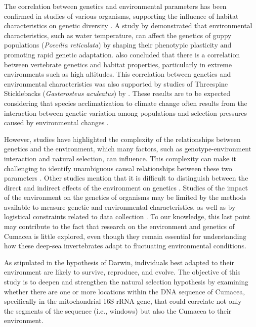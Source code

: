 The correlation between genetics and environmental parameters has been confirmed in studies of various organisms, supporting the influence of habitat characteristics on genetic diversity \citep{colosimo_widespread_2005,cheviron_genomic_2012}. A study by \cite{ghalambor_adaptive_2007} demonstrated that environmental characteristics, such as water temperature, can affect the genetics of guppy populations (\emph{Poecilia reticulata}) by shaping their phenotypic plasticity and promoting rapid genetic adaptation. \cite{cheviron_genomic_2012} also concluded that there is a correlation between vertebrate genetics and habitat properties, particularly in extreme environments such as high altitudes. This correlation between genetics and environmental characteristics was also supported by studies of Threespine Sticklebacks (\emph{Gasterosteus aculeatus}) by \citep{colosimo_widespread_2005}. These results are to be expected considering that species acclimatization to climate change often results from the interaction between genetic variation among populations and selection pressures caused by environmental changes \citep{hoffmann_climate_2011}.

However, studies have highlighted the complexity of the relationships between genetics and the environment, which many factors, such as genotype-environment interaction and natural selection, can influence. This complexity can make it challenging to identify unambiguous causal relationships between these two parameters \citep{balkenhol_identifying_2009}. Other studies mention that it is difficult to distinguish between the direct and indirect effects of the environment on genetics \citep{manel_perspectives_2010, balkenhol_landscape_2019}. Studies of the impact of the environment on the genetics of organisms may be limited by the methods available to measure genetic and environmental characteristics, as well as by logistical constraints related to data collection \citep{manel_perspectives_2010, shafer_widespread_2013}. To our knowledge, this last point may contribute to the fact that research on the environment and genetics of Cumacea is little explored, even though they remain essential for understanding how these deep-sea invertebrates adapt to fluctuating environmental conditions.

As stipulated in the hypothesis of Darwin, individuals best adapted to their environment are likely to survive, reproduce, and evolve. The objective of this study is to deepen and strengthen the natural selection hypothesis by examining whether there are one or more locations within the DNA sequence of Cumacea, specifically in the mitochondrial 16S rRNA gene, that could correlate not only the segments of the sequence (i.e., windows) but also the Cumacea to their environment.

